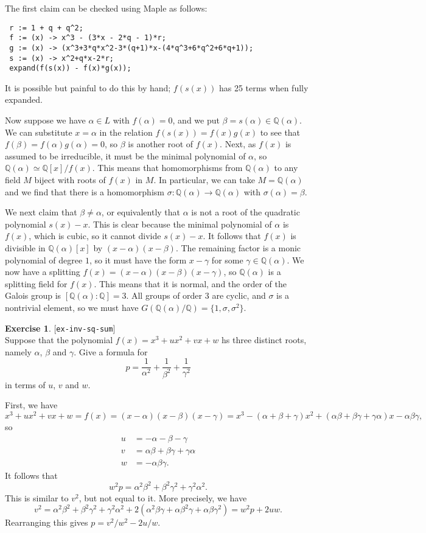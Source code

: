 \documentclass{amsart}
\newcommand{\Q}         {{\mathbb{Q}}}
\newcommand{\al}        {\alpha}
\newcommand{\bt}        {\beta}
\newcommand{\gm}        {\gamma}
\newcommand{\sg}        {\sigma}
\renewcommand{\:}{\colon}
\newcommand{\lastexlabel}{}
\newcommand{\exlabel}[1]{
 \global\def\lastexlabel{#1}\label{#1}[\texttt{#1}]\ \\
}
\newcommand{\exlabel}[1]{
 \global\def\lastexlabel{#1}\label{#1}
}
\newenvironment{solution}{\SolutionInline}{\endSolutionInline}
\theoremstyle{definition}
\newtheorem{exercise}{Exercise}[section]
\renewenvironment{solution}{\SolutionAtEnd}{\endSolutionAtEnd}
\begin{document}
\begin{solution}
 The first claim can be checked using Maple as follows:
\begin{verbatim}
 r := 1 + q + q^2;
 f := (x) -> x^3 - (3*x - 2*q - 1)*r;
 g := (x) -> (x^3+3*q*x^2-3*(q+1)*x-(4*q^3+6*q^2+6*q+1));
 s := (x) -> x^2+q*x-2*r;
 expand(f(s(x)) - f(x)*g(x));
\end{verbatim}
 It is possible but painful to do this by hand; $f(s(x))$ has 25 terms
 when fully expanded.

 Now suppose we have $\al\in L$ with $f(\al)=0$, and we put
 $\bt=s(\al)\in\Q(\al)$.  We can substitute $x=\al$ in the relation
 $f(s(x))=f(x)g(x)$ to see that $f(\bt)=f(\al)g(\al)=0$, so $\bt$ is
 another root of $f(x)$.  Next, as $f(x)$ is assumed to be
 irreducible, it must be the minimal polynomial of $\al$, so
 $\Q(\al)\simeq\Q[x]/f(x)$.  This means that homomorphisms from
 $\Q(\al)$ to any field $M$ biject with roots of $f(x)$ in $M$.  In
 particular, we can take $M=\Q(\al)$ and we find that there is a
 homomorphism $\sg\:\Q(\al)\to\Q(\al)$ with $\sg(\al)=\bt$.  

 We next claim that $\bt\neq\al$, or equivalently that $\al$ is not a
 root of the quadratic polynomial $s(x)-x$.  This is clear because the
 minimal polynomial of $\al$ is $f(x)$, which is cubic, so it cannot
 divide $s(x)-x$.  It follows that $f(x)$ is divisible in $\Q(\al)[x]$
 by $(x-\al)(x-\bt)$.  The remaining factor is a monic polynomial
 of degree $1$, so it must have the form $x-\gm$ for some
 $\gm\in\Q(\al)$.  We now have a splitting
 $f(x)=(x-\al)(x-\bt)(x-\gm)$, so $\Q(\al)$ is a splitting field for
 $f(x)$.  This means that it is normal, and the order of the Galois
 group is $[\Q(\al):\Q]=3$.  All groups of order $3$ are cyclic, and
 $\sg$ is a nontrivial element, so we must have
 $G(\Q(\al)/\Q)=\{1,\sg,\sg^2\}$. 
\end{solution}
\begin{exercise}\exlabel{ex-inv-sq-sum}
 Suppose that the polynomial $f(x)=x^3+ux^2+vx+w$ hs three distinct
 roots, namely $\al$, $\bt$ and $\gm$.  Give a formula for 
 \[ p = \frac{1}{\al^2} + \frac{1}{\bt^2} + \frac{1}{\gm^2} \]
 in terms of $u$, $v$ and $w$.
\end{exercise}
\begin{solution}
 First, we have 
 \[ x^3+ux^2+vx+w = f(x) = (x-\al)(x-\bt)(x-\gm) = 
     x^3 - (\al+\bt+\gm) x^2 + (\al\bt+\bt\gm+\gm\al) x - \al\bt\gm,
 \]
 so 
 \begin{align*}
  u &= -\al-\bt-\gm \\
  v &= \al\bt+\bt\gm+\gm\al \\
  w &= -\al\bt\gm.
 \end{align*}
 It follows that 
 \[ w^2p = \al^2\bt^2 + \bt^2\gm^2 + \gm^2\al^2. \]
 This is similar to $v^2$, but not equal to it.  More precisely, we
 have 
 \[ v^2 = \al^2\bt^2 + \bt^2\gm^2 + \gm^2\al^2 +
          2(\al^2\bt\gm + \al\bt^2\gm + \al\bt\gm^2) 
        = w^2p + 2uw.
 \]
 Rearranging this gives $p=v^2/w^2-2u/w$.
\end{solution}
\end{document}
